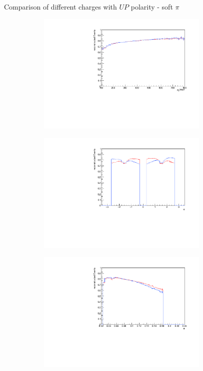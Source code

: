 \documentclass[11pt]{beamer}
\begin{document}
\begin{frame}{Comparison of different charges with $UP$ polarity - soft $\pi$}
\begin{figure}
\begin{subfigure}{0.45\textwidth}
\includegraphics[width=0.9\textwidth]{fourth/up_pdf/combined/h_pt_reco_SPi.pdf}
\end{subfigure}
\begin{subfigure}{0.45\textwidth}
\includegraphics[width=0.9\textwidth]{fourth/up_pdf/combined/h_phi_reco_SPi.pdf}
\end{subfigure}
\begin{subfigure}{0.45\textwidth}
\includegraphics[width=0.9\textwidth]{fourth/up_pdf/combined/h_theta_reco_SPi.pdf}

\end{subfigure}
\end{figure}
\end{frame}
\end{document}
